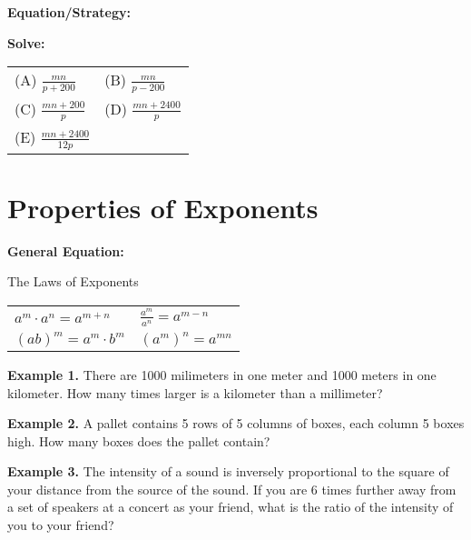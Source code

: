 \begin{multicols*}{2}
\begin{outline}[enumerate]
\bigskip
\textbf{Equation/Strategy:} \hrulefill

\bigskip
\textbf{Solve:}

\vfill
\begin{spacing}{2.75}
\begin{tabularx}{0.4\textwidth}{*2{@{}X}}
(A) $\frac{mn}{p+200}$ & (B) $\frac{mn}{p-200}$\\
(C) $\frac{mn+200}{p}$ & (D) $\frac{mn+2400}{p}$\\
(E) $\frac{mn+2400}{12p}$
\end{tabularx}
\pagebreak
\end{spacing}
\end{outline}
\end{multicols*}

\newpage
\section{Properties of Exponents}

\bigskip
\textbf{General Equation:} 

\centerline{The Laws of Exponents}

\begin{spacing}{2}
\begin{tabularx}{\textwidth}{*2{@{}>{\centering\arraybackslash}X}}
$a^m\cdot a^n = a^{m+n}$ & $\frac{a^m}{a^n}=a^{m-n}$\\
$(ab)^m=a^m\cdot b^m$ & $(a^m)^n=a^{mn}$
\end{tabularx}
\end{spacing}

\vfill
\textbf{Example 1.} There are 1000 milimeters in one meter and 1000 meters in one kilometer. How many times larger is a kilometer than a millimeter?

\vfill
\textbf{Example 2.} A pallet contains 5 rows of 5 columns of boxes, each column 5 boxes high. How many boxes does the pallet contain?

\vfill
\textbf{Example 3.} The intensity of a sound is inversely proportional to the square of your distance from the source of the sound. If  you are 6 times further away from a set of speakers at a concert as your friend, what is the ratio of the intensity of you to your friend?

